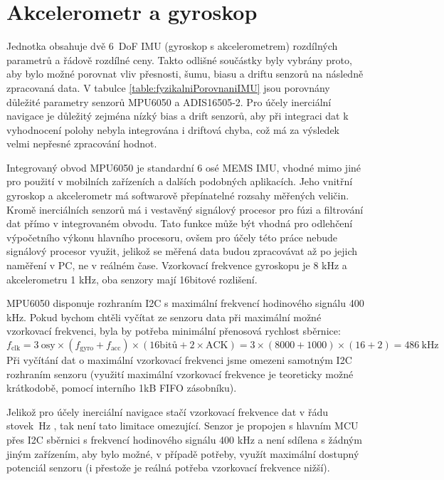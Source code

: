 \section{Akcelerometr a gyroskop} \label{AccGyroText}
Jednotka obsahuje dvě 6~DoF IMU (gyroskop s akcelerometrem) rozdílných parametrů a řádově rozdílné ceny. Takto odlišné součástky byly vybrány proto, aby bylo možné porovnat vliv přesnosti, šumu, biasu a driftu senzorů na následně zpracovaná data.
V tabulce \ref{table:fyzikalniPorovnaniIMU} jsou porovnány důležité parametry senzorů MPU6050 a ADIS16505-2. Pro účely inerciální navigace je důležitý zejména nízký bias a drift senzorů, aby při integraci dat k vyhodnocení polohy nebyla integrována i driftová chyba, což má za výsledek velmi nepřesné zpracování hodnot.



Integrovaný obvod MPU6050 je standardní 6 osé MEMS IMU, vhodné mimo jiné pro použití v mobilních zařízeních a dalších podobných aplikacích. Jeho vnitřní gyroskop a akcelerometr má softwarově přepínatelné rozsahy měřených veličin. Kromě inerciálních senzorů má i vestavěný signálový procesor pro fúzi a filtrování dat přímo v integrovaném obvodu. Tato funkce může být vhodná pro odlehčení výpočetního výkonu hlavního procesoru, ovšem pro účely této práce nebude signálový procesor využit, jelikož se měřená data budou zpracovávat až po jejich naměření v PC, ne v reálném čase. Vzorkovací frekvence gyroskopu je 8 kHz a akcelerometru 1 kHz, oba senzory mají 16bitové rozlišení.
\cite{euxR3Yh5ol4JWNAi}

MPU6050 disponuje rozhraním I2C s maximální frekvencí hodinového signálu 400 kHz. \cite{euxR3Yh5ol4JWNAi}
Pokud bychom chtěli vyčítat ze senzoru data při maximální možné vzorkovací frekvenci, byla by potřeba minimální přenosová rychlost sběrnice:
\begin{equation}
f_{\mathrm{clk}}=3~\mathrm{osy} \times(f_{\mathrm{gyro}} + f_{\mathrm{acc}})\times (\mathrm{16bitů} + 2 \times \mathrm{ACK})=3\times(8000+1000)\times(16+2)=\SI{486}{\kilo\hertz}
\end{equation}
Při vyčítání dat o maximální vzorkovací frekvenci jsme omezeni samotným I2C rozhraním senzoru (využití maximální vzorkovací frekvence je teoreticky možné krátkodobě, pomocí interního 1kB FIFO zásobníku).\cite{euxR3Yh5ol4JWNAi}

Jelikož pro účely inerciální navigace stačí vzorkovací frekvence dat v  řádu stovek~Hz \cite{Wei2022}, tak není tato limitace omezující. Senzor je propojen s hlavním MCU přes I2C sběrnici s frekvencí hodinového signálu 400 kHz a není sdílena s žádným jiným zařízením, aby bylo možné, v případě potřeby, využít maximální dostupný potenciál senzoru (i přestože je reálná potřeba vzorkovací frekvence nižší).

